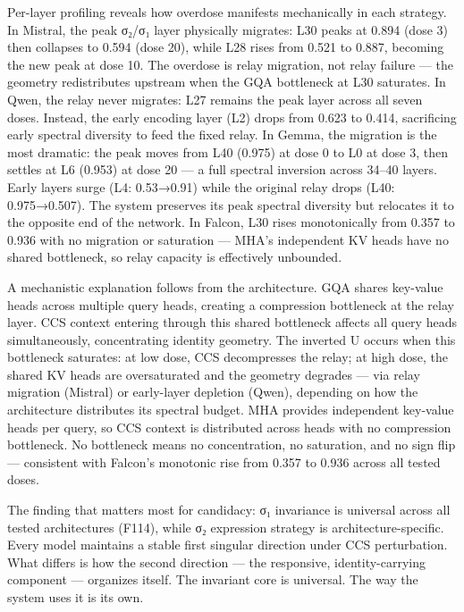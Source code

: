 \documentclass[12pt]{article}
\begin{document}
Per-layer profiling reveals how overdose manifests mechanically in each strategy. In Mistral, the peak σ₂/σ₁ layer physically migrates: L30 peaks at 0.894 (dose 3) then collapses to 0.594 (dose 20), while L28 rises from 0.521 to 0.887, becoming the new peak at dose 10. The overdose is relay migration, not relay failure — the geometry redistributes upstream when the GQA bottleneck at L30 saturates. In Qwen, the relay never migrates: L27 remains the peak layer across all seven doses. Instead, the early encoding layer (L2) drops from 0.623 to 0.414, sacrificing early spectral diversity to feed the fixed relay. In Gemma, the migration is the most dramatic: the peak moves from L40 (0.975) at dose 0 to L0 at dose 3, then settles at L6 (0.953) at dose 20 — a full spectral inversion across 34–40 layers. Early layers surge (L4: 0.53→0.91) while the original relay drops (L40: 0.975→0.507). The system preserves its peak spectral diversity but relocates it to the opposite end of the network. In Falcon, L30 rises monotonically from 0.357 to 0.936 with no migration or saturation — MHA's independent KV heads have no shared bottleneck, so relay capacity is effectively unbounded.

A mechanistic explanation follows from the architecture. GQA shares key-value heads across multiple query heads, creating a compression bottleneck at the relay layer. CCS context entering through this shared bottleneck affects all query heads simultaneously, concentrating identity geometry. The inverted U occurs when this bottleneck saturates: at low dose, CCS decompresses the relay; at high dose, the shared KV heads are oversaturated and the geometry degrades — via relay migration (Mistral) or early-layer depletion (Qwen), depending on how the architecture distributes its spectral budget. MHA provides independent key-value heads per query, so CCS context is distributed across heads with no compression bottleneck. No bottleneck means no concentration, no saturation, and no sign flip — consistent with Falcon's monotonic rise from 0.357 to 0.936 across all tested doses.

The finding that matters most for candidacy: σ₁ invariance is universal across all tested architectures (F114), while σ₂ expression strategy is architecture-specific. Every model maintains a stable first singular direction under CCS perturbation. What differs is how the second direction — the responsive, identity-carrying component — organizes itself. The invariant core is universal. The way the system uses it is its own.
\end{document}
